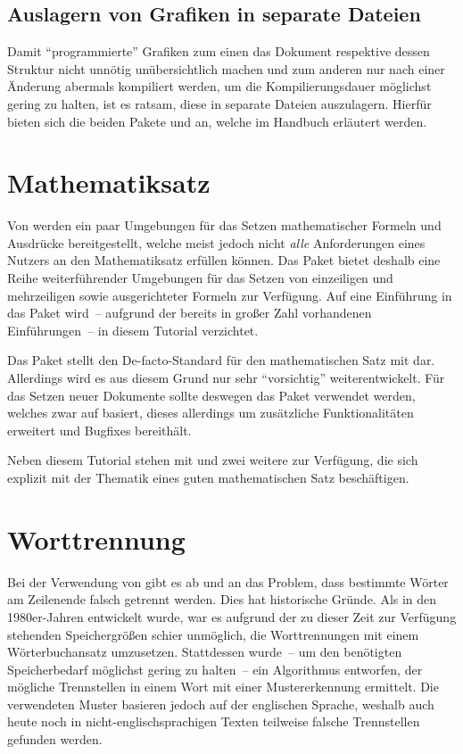 \documentclass[%
  english,ngerman,%
  geometry=no,DIV=12,automark,%
]{tudscrartcl}
\begin{document}
\subsection{Auslagern von Grafiken in separate Dateien}
Damit \enquote{programmierte} Grafiken zum einen das Dokument respektive dessen 
Struktur nicht unnötig unübersichtlich machen und zum anderen nur nach einer 
Änderung abermals kompiliert werden, um die Kompilierungsdauer möglichst gering 
zu halten, ist es ratsam, diese in separate Dateien auszulagern. Hierfür bieten 
sich die beiden Pakete  und  an, welche 
im Handbuch erläutert werden.


\section{Mathematiksatz}
Von  werden ein paar Umgebungen für das Setzen mathematischer 
Formeln und Ausdrücke bereitgestellt, welche meist jedoch nicht \emph{alle} 
Anforderungen eines Nutzers an den Mathematiksatz erfüllen können. Das Paket
 bietet deshalb eine Reihe weiterführender Umgebungen für das 
Setzen von einzeiligen und mehrzeiligen sowie ausgerichteter Formeln zur 
Verfügung. Auf eine Einführung in das Paket wird~-- aufgrund der bereits in 
großer Zahl vorhandenen Einführungen~-- in diesem Tutorial verzichtet. 

Das Paket  stellt den De-facto-Standard für den mathematischen 
Satz mit  dar. Allerdings wird es aus diesem Grund nur sehr 
\enquote{vorsichtig} weiterentwickelt. Für das Setzen neuer Dokumente sollte 
deswegen das Paket  verwendet werden, welches zwar auf 
 basiert, dieses allerdings um zusätzliche Funktionalitäten 
erweitert und Bugfixes bereithält.

Neben diesem Tutorial stehen mit  und  
zwei weitere zur Verfügung, die sich explizit mit der Thematik eines guten 
mathematischen Satz beschäftigen.



\section{Worttrennung}
\label{sec:hyphenation}
Bei der Verwendung von  gibt es ab und an das Problem, dass 
bestimmte Wörter am Zeilenende falsch getrennt werden. Dies hat historische 
Gründe. Als  in den 1980er-Jahren entwickelt wurde, war es aufgrund 
der zu dieser Zeit zur Verfügung stehenden Speichergrößen schier unmöglich, die 
Worttrennungen mit einem Wörterbuchansatz umzusetzen. Stattdessen wurde~-- um 
den benötigten Speicherbedarf möglichst gering zu halten~-- ein Algorithmus 
entworfen, der mögliche Trennstellen in einem Wort mit einer Mustererkennung 
ermittelt. Die verwendeten Muster basieren jedoch auf der englischen Sprache, 
weshalb auch heute noch in nicht-englischsprachigen Texten teilweise falsche 
Trennstellen gefunden werden.
\end{document}

